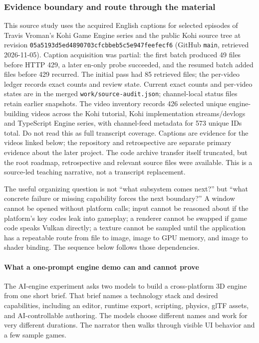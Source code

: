 \subsubsection{Evidence boundary and route through the material}\label{evidence-boundary-and-route-through-the-material}

This source study uses the acquired English captions for selected episodes of Travis Vroman's Kohi Game Engine series and the public Kohi source tree at revision \texttt{05a5193d5ed4890703cfcbbeb5c5e947feefecf6} (GitHub \texttt{main}, retrieved 2026-11-05). Caption acquisition was partial: the first batch produced 49 files before HTTP 429, a later en-only probe succeeded, and the resumed batch added files before 429 recurred. The initial pass had 85 retrieved files; the per-video ledger records exact counts and review state. Current exact counts and per-video states are in the merged \texttt{work/source-audit.json}; channel-local status files retain earlier snapshots. The video inventory records 426 selected unique engine-building videos across the Kohi tutorial, Kohi implementation streams/devlogs and TypeScript Engine series, with channel-feed metadata for 573 unique IDs total. Do not read this as full transcript coverage. Captions are evidence for the videos linked below; the repository and retrospective are separate primary evidence about the later project. The code archive transfer itself truncated, but the root roadmap, retrospective and relevant source files were available. This is a source-led teaching narrative, not a transcript replacement.

The useful organizing question is not ``what subsystem comes next?'' but ``what concrete failure or missing capability forces the next boundary?'' A window cannot be opened without platform calls; input cannot be reasoned about if the platform's key codes leak into gameplay; a renderer cannot be swapped if game code speaks Vulkan directly; a texture cannot be sampled until the application has a repeatable route from file to image, image to GPU memory, and image to shader binding. The sequence below follows those dependencies.

\paragraph{What a one-prompt engine demo can and cannot prove}\label{what-a-one-prompt-engine-demo-can-and-cannot-prove}

The AI-engine experiment asks two models to build a cross-platform 3D engine from one short brief. That brief names a technology stack and desired capabilities, including an editor, runtime export, scripting, physics, glTF assets, and AI-controllable authoring. The models choose different names and work for very different durations. The narrator then walks through visible UI behavior and a few sample games.

